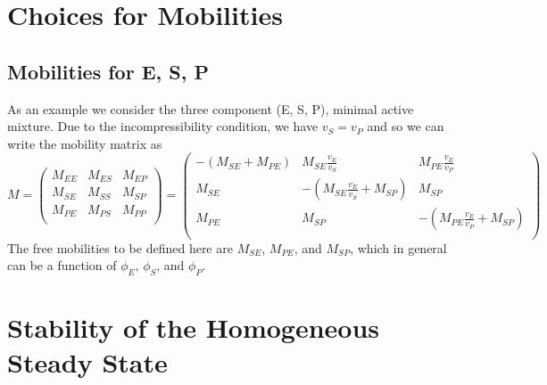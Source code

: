 \section{Choices for Mobilities}


\subsection{Mobilities for E, S, P}
As an example we consider the three component (E, S, P), minimal active mixture. Due to the incompressibility condition, we have $v_S=v_P$ and so we can write the mobility matrix as
\begin{equation}
M = 
\begin{pmatrix}
M_{EE} & M_{ES} & M_{EP}\\
M_{SE} & M_{SS} & M_{SP}\\
M_{PE} & M_{PS} & M_{PP}\\
\end{pmatrix}
=
\begin{pmatrix}
-(M_{SE}+M_{PE}) & M_{SE}\frac{v_E}{v_S} & M_{PE}\frac{v_E}{v_P}\\
M_{SE} & -(M_{SE}\frac{v_E}{v_S}+M_{SP}) & M_{SP}\\
M_{PE} & M_{SP} & -(M_{PE}\frac{v_E}{v_P}+M_{SP})\\
\end{pmatrix}
\label{ESP_mob}
\end{equation}
The free mobilities to be defined here are $M_{SE}$, $M_{PE}$, and $M_{SP}$, which in general can be a function of $\phi_E$, $\phi_S$, and $\phi_P$.

\section{Stability of the Homogeneous Steady State}
